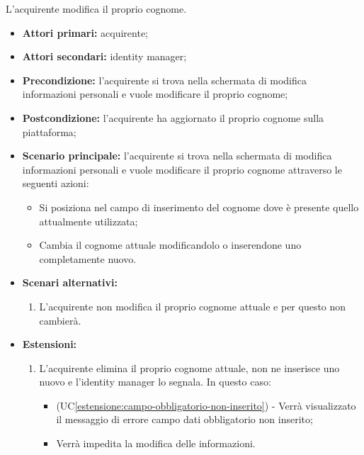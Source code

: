 L'acquirente modifica il proprio cognome.
\begin{itemize}
    \item \textbf{Attori primari:} acquirente;
    \item \textbf{Attori secondari:} identity manager;
    \item \textbf{Precondizione:} l'acquirente si trova nella schermata di modifica informazioni personali e vuole modificare il proprio cognome;
    \item \textbf{Postcondizione:} l'acquirente ha aggiornato il proprio cognome sulla piattaforma;
    \item \textbf{Scenario principale:} l'acquirente si trova nella schermata di modifica informazioni personali e vuole modificare il proprio cognome attraverso le seguenti azioni:
        \begin{itemize}
            \item Si posiziona nel campo di inserimento del cognome dove è presente quello attualmente utilizzata;
            \item Cambia il cognome attuale modificandolo o inserendone uno completamente nuovo.
        \end{itemize}
    \item \textbf{Scenari alternativi:} 
    \begin{enumerate}[label=\lett]
        \item L'acquirente non modifica il proprio cognome attuale e per questo non cambierà.
    \end{enumerate}
    \item \textbf{Estensioni:} 
    \begin{enumerate}[label=\lett]
        \item L'acquirente elimina il proprio cognome attuale, non ne inserisce uno nuovo e l'identity manager lo segnala. In questo caso:
        \begin{itemize}
            \item (UC\ref{estensione:campo-obbligatorio-non-inserito}) - Verrà visualizzato il messaggio di errore campo dati obbligatorio non inserito;
            \item Verrà impedita la modifica delle informazioni.
        \end{itemize}
    \end{enumerate}
\end{itemize}

\label{modifica-informazioni-acquirente.email}

